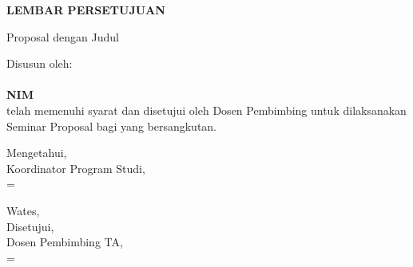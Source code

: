 
\newpage

\newcommand{\smartsignature}[2]{%
    \setbox0=\hbox{#1}%
    \ifdim\wd0>0.47\textwidth
        {\small #1\\[0.3em]#2}%
    \else
        {#1\\[0.3em]#2}%
    \fi
}

\begin{center}
    \begin{doublespace}
        \textbf{\large \MakeUppercase{lembar persetujuan}}
    \end{doublespace}
\end{center}

\begin{center}
    Proposal {\tipe} dengan Judul
\end{center}

\begin{center}
    \begin{doublespace}
        \textbf{\large \MakeUppercase {\judulid}}
    \end{doublespace}
\end{center}

\begin{center}
    Disusun oleh:\\
    \textbf{\penulis}\\
    \textbf{NIM \nim}\\[1.5cm]

    telah memenuhi syarat dan disetujui oleh Dosen Pembimbing untuk dilaksanakan Seminar Proposal {\tipe} bagi yang bersangkutan.\\[0.75cm]
\end{center}

\vspace{0.75cm}
\noindent\begin{minipage}[t]{0.47\textwidth}
    \centering
    \vspace{1.5em}
    Mengetahui,\\
    Koordinator Program Studi,\\[2.5cm]
    
    \smartsignature{\koorprodi}{NIP. \NIPkoorprodi}
\end{minipage}%
\hfill%
\begin{minipage}[t]{0.47\textwidth}
    \centering
    Wates, \tglpersetujuan\\[1em]
    Disetujui,\\
    Dosen Pembimbing TA,\\[2.5cm]
    
    \smartsignature{\pembimbing}{NIP. \NIPpembimbing}
\end{minipage}%
